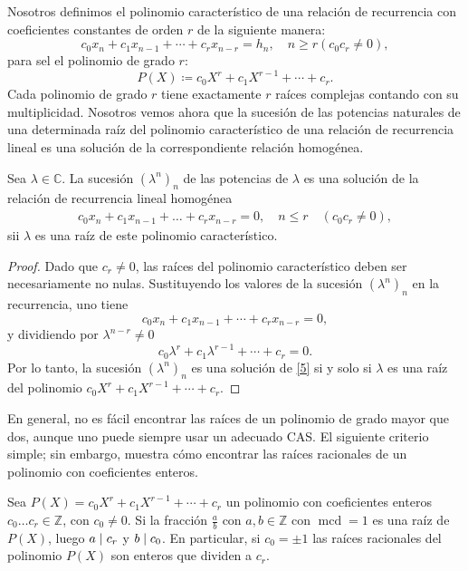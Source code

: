 \begin{definition}
	Nosotros definimos el polinomio característico de una relación de recurrencia con coeficientes constantes de orden $r$ de la siguiente manera: \[ c_{0}x_{n}+c_{1}x_{n-1}+\cdots+c_{r}x_{n-r}=h_{n},\quad n\geq r\left(c_{0}c_{r}\neq0\right), \] para sel el polinomio de grado $r$: \[ P(X)\coloneqq c_{0}X^{r}+c_{1}X^{r-1}+\cdots+c_{r}. \] Cada polinomio de grado $r$ tiene exactamente $r$ raíces complejas contando con su multiplicidad. Nosotros vemos ahora que la sucesión de las potencias naturales de una determinada raíz del polinomio característico de una relación de recurrencia lineal es una solución de la correspondiente relación homogénea.
\end{definition}

\begin{proposition}
	Sea $\lambda\in\mathds{C}$. La sucesión $\left(\lambda^{n}\right)_{n}$ de las potencias de $\lambda$ es una solución de la relación de recurrencia lineal homogénea
	\begin{align}\label{5}
	c_{0}x_{n}+c_{1}x_{n-1}+\ldots+c_{r}x_{n-r}=0,\quad n\leq r \quad (c_{0}c_{r}\neq 0),
	\end{align}
	sii $\lambda$ es una raíz de este polinomio característico.
\end{proposition}

\begin{proof}
	Dado que $c_{r}\neq0$, las raíces del polinomio característico deben ser necesariamente no nulas. Sustituyendo los valores de la sucesión ${\left(\lambda^{n}\right)}_{n}$ en la recurrencia, uno tiene \[ c_{0}x_{n}+c_{1}x_{n-1}+\cdots+c_{r}x_{n-r}=0, \] y dividiendo por $\lambda^{n-r}\neq0$ \[ c_{0}\lambda^{r}+c_{1}\lambda^{r-1}+\cdots+c_{r}=0. \]	Por lo tanto, la sucesión ${\left(\lambda^{n}\right)}_{n}$ es una solución de \eqref{5} si y solo si $\lambda$ es una raíz del polinomio $c_{0}X^{r}+c_{1}X^{r-1}+\cdots+c_{r}$.
\end{proof}

En general, no es fácil encontrar las raíces de un polinomio de grado mayor que dos, aunque uno puede siempre usar un adecuado CAS. El siguiente criterio simple; sin embargo, muestra cómo encontrar las raíces racionales de un polinomio con coeficientes enteros.

\begin{proposition}
	Sea $P(X)=c_{0}X^{r}+c_{1}X^{r-1}+\cdots+c_{r}$ un polinomio con coeficientes enteros $c_{0}\ldots c_{r}\in\mathds{Z}$, con $c_{0}\neq 0$. Si la fracción $\tfrac{a}{b}$ con $a,b\in\mathds{Z}$ con $\operatorname{mcd}=1$ es una raíz de $P(X)$, luego $a\mid c_{r}$ y $b\mid c_{0}$. En particular, si $c_{0}=\pm1$ las raíces racionales del polinomio $P(X)$ son enteros que dividen a $c_{r}$.
\end{proposition}

